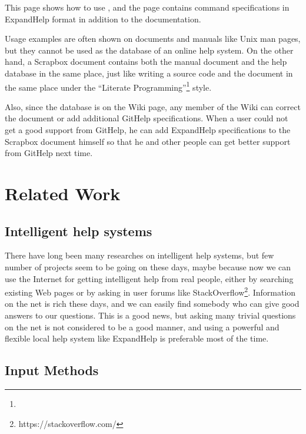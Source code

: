 \documentclass{sigchi}
\def\GH{\textsf{GitHelp}}
\def\SB{\textsf{Scrapbox}}
\def\EH{\textsf{ExpandHelp}}
\begin{document}
This page shows how to use , and
the page contains command specifications in {\EH} format
in addition to the documentation.


Usage examples are often shown on documents and manuals like Unix man pages,
but they cannot be used as the database of an online help system.
On the other hand,
a {\SB} document contains both the manual document and the help database
in the same place, just like
writing a source code and the document in the same place
under the ``Literate Programming''\footnote{
} style.

Also, since the database is on the Wiki page, any member of the
Wiki can correct the document or add additional {\GH} specifications.
When a user could not get a good support from {\GH}, he can add
{\EH} specifications to the {\SB} document himself
so that he and other people can get better support
from {\GH} next time.

\section{Related Work}

\subsection{Intelligent help systems}

There have long been many researches on
intelligent help systems\cite{Delisle:2002:UIH:606412.606415},
but few number of projects seem to be going on these days,
maybe because now we can use the Internet for getting intelligent help from
real people,
either by searching existing Web pages or 
by asking in user forums like StackOverflow\footnote{
  \textsf{https://stackoverflow.com/}
}.
Information on the net is rich these days, and we can easily
find somebody who can give good answers to our questions.
This is a good news, but 
asking many trivial questions on the net is not considered to be a
good manner, and
using a powerful and flexible local help system like {\EH} is
preferable most of the time.

\subsection{Input Methods}
\end{document}
